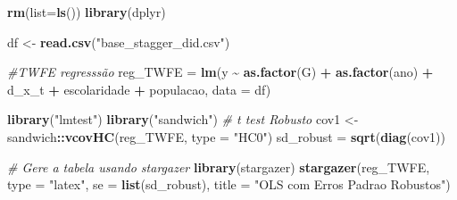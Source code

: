 \documentclass[
]{article}
\author{}
\date{\vspace{-2.5em}}
\newenvironment{Shaded}{\begin{snugshade}}{\end{snugshade}}
\newcommand{\AttributeTok}[1]{\textcolor[rgb]{0.13,0.29,0.53}{#1}}
\newcommand{\CommentTok}[1]{\textcolor[rgb]{0.56,0.35,0.01}{\textit{#1}}}
\newcommand{\FunctionTok}[1]{\textcolor[rgb]{0.13,0.29,0.53}{\textbf{#1}}}
\newcommand{\NormalTok}[1]{#1}
\newcommand{\OtherTok}[1]{\textcolor[rgb]{0.56,0.35,0.01}{#1}}
\newcommand{\SpecialCharTok}[1]{\textcolor[rgb]{0.81,0.36,0.00}{\textbf{#1}}}
\newcommand{\StringTok}[1]{\textcolor[rgb]{0.31,0.60,0.02}{#1}}
\begin{document}
\begin{Shaded}
\begin{Highlighting}[]
\FunctionTok{rm}\NormalTok{(}\AttributeTok{list=}\FunctionTok{ls}\NormalTok{())}
\FunctionTok{library}\NormalTok{(dplyr)}

\NormalTok{df }\OtherTok{\textless{}{-}} \FunctionTok{read.csv}\NormalTok{(}\StringTok{"base\_stagger\_did.csv"}\NormalTok{)}
\end{Highlighting}
\end{Shaded}

\begin{Shaded}
\begin{Highlighting}[]
\CommentTok{\#TWFE regresssão}
\NormalTok{reg\_TWFE }\OtherTok{=} \FunctionTok{lm}\NormalTok{(y }\SpecialCharTok{\textasciitilde{}} \FunctionTok{as.factor}\NormalTok{(G) }\SpecialCharTok{+} \FunctionTok{as.factor}\NormalTok{(ano) }\SpecialCharTok{+}\NormalTok{ d\_x\_t }\SpecialCharTok{+}\NormalTok{ escolaridade }\SpecialCharTok{+}\NormalTok{ populacao, }\AttributeTok{data =}\NormalTok{ df)}

\FunctionTok{library}\NormalTok{(}\StringTok{"lmtest"}\NormalTok{)}
\FunctionTok{library}\NormalTok{(}\StringTok{"sandwich"}\NormalTok{)}
\CommentTok{\# t test Robusto}
\NormalTok{cov1 }\OtherTok{\textless{}{-}}\NormalTok{ sandwich}\SpecialCharTok{::}\FunctionTok{vcovHC}\NormalTok{(reg\_TWFE, }\AttributeTok{type =} \StringTok{"HC0"}\NormalTok{)}
\NormalTok{sd\_robust }\OtherTok{=} \FunctionTok{sqrt}\NormalTok{(}\FunctionTok{diag}\NormalTok{(cov1))}

\CommentTok{\# Gere a tabela usando stargazer}
\FunctionTok{library}\NormalTok{(stargazer)}
\FunctionTok{stargazer}\NormalTok{(reg\_TWFE, }\AttributeTok{type =} \StringTok{"latex"}\NormalTok{, }\AttributeTok{se =} \FunctionTok{list}\NormalTok{(sd\_robust),}
\AttributeTok{title =} \StringTok{"OLS com Erros Padrao Robustos"}\NormalTok{)}
\end{Highlighting}
\end{Shaded}
\end{document}
